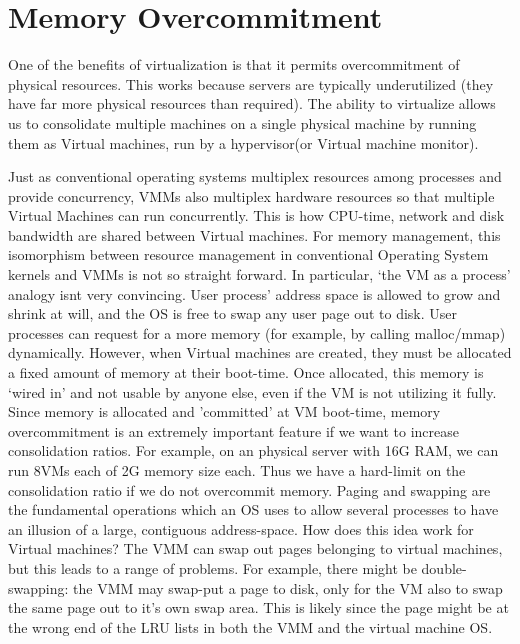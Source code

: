 \documentclass[10pt,a4paper]{article}
\begin{document}
\section{Memory  Overcommitment}

One of the benefits of virtualization is that it permits overcommitment of physical resources. This works because servers are typically underutilized (they have far more physical resources than required). The ability to virtualize allows us to consolidate multiple machines on a single physical machine by running them as Virtual machines, run by a hypervisor(or Virtual machine monitor).

Just as conventional operating systems multiplex resources among processes and provide concurrency, VMMs also multiplex hardware resources so that multiple Virtual Machines can run concurrently.
This is how CPU-time, network and disk bandwidth are shared between Virtual machines. For memory management, this isomorphism between resource management in conventional Operating System kernels and VMMs is not so straight forward. 
In particular, `the VM as a process'  analogy isnt very convincing. User process' address space is allowed to grow and shrink at will, and the OS is free to swap any user page out to disk. User processes can request for a more memory (for example, by calling malloc/mmap) dynamically. 
However, when Virtual machines are created, they must be allocated a fixed amount of memory at their boot-time. Once allocated, this memory is `wired in' and not usable by anyone else, even if the VM is not utilizing it fully. 
Since memory is allocated and 'committed' at VM boot-time, memory overcommitment is an extremely important feature if we want to increase consolidation ratios. 
For example, on an physical server with 16G RAM, we can run 8VMs each of 2G memory size each. Thus we have a hard-limit on the consolidation ratio if we do not overcommit memory.
Paging and swapping are the fundamental operations which an OS uses to allow several processes to have an illusion of a large, contiguous address-space. How does this idea work for Virtual machines? The VMM can swap out pages belonging to virtual machines, but this leads to  a range of problems. For example, there might be double-swapping: the VMM may swap-put a page to disk, only for the VM also to swap the same page out to it's own swap area. This is likely since the page might be at the wrong end of the LRU lists in both the VMM and the virtual machine OS. 
\end{document}
